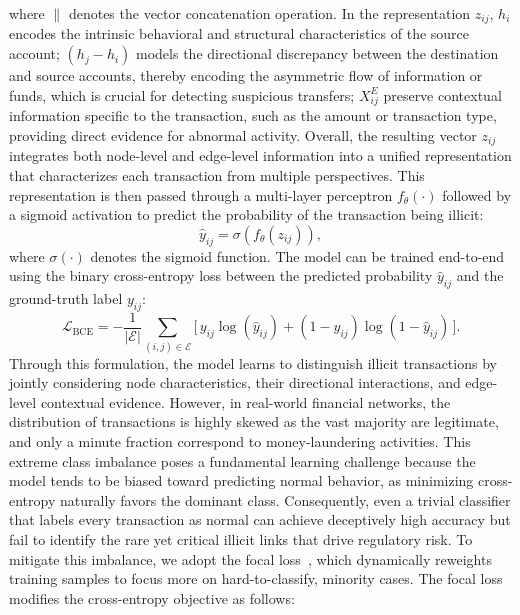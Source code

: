 \documentclass[11pt,english]{article}
\renewcommand{\hat}{\widehat}
\begin{document}
where $\|$ denotes the vector concatenation operation. In the representation $z_{ij}$, $h_i$ encodes the intrinsic behavioral and structural characteristics of the source account; $(h_j - h_i)$ models the directional discrepancy between the destination and source accounts, thereby encoding the asymmetric flow of information or funds, which is crucial for detecting suspicious transfers; $X^E_{ij}$ preserve contextual information specific to the transaction, such as the amount or transaction type, providing direct evidence for abnormal activity. Overall, the resulting vector $z_{ij}$ integrates both node-level and edge-level information into a unified representation that characterizes each transaction from multiple perspectives. This representation is then passed through a multi-layer perceptron $f_{\theta}(\cdot)$ followed by a sigmoid activation to predict the probability of the transaction being illicit:
\begin{equation}
    \hat{y}_{ij} = \sigma ( f_\theta(z_{ij})),
\end{equation}
where $\sigma(\cdot)$ denotes the sigmoid function. The model can be trained end-to-end using the binary cross-entropy loss between the predicted probability $\hat{y}_{ij}$ and the ground-truth label $y_{ij}$:
\begin{equation}
    \mathcal{L}_{\text{BCE}} = - \frac{1}{|\mathcal{E}|} \sum_{(i,j) \in \mathcal{E}} \Big[\, y_{ij} \log(\hat{y}_{ij}) + (1 - y_{ij}) \log(1 - \hat{y}_{ij}) \,\Big].
\end{equation}
Through this formulation, the model learns to distinguish illicit transactions by jointly considering node characteristics, their directional interactions, and edge-level contextual evidence. 
However, in real-world financial networks, the distribution of transactions is highly skewed as the vast majority are legitimate, and only a minute fraction correspond to money-laundering activities. This extreme class imbalance poses a fundamental learning challenge because the model tends to be biased toward predicting normal behavior, as minimizing cross-entropy naturally favors the dominant class. Consequently, even a trivial classifier that labels every transaction as normal can achieve deceptively high accuracy but fail to identify the rare yet critical illicit links that drive regulatory risk. To mitigate this imbalance, we adopt the focal loss~\parencite{lin2017focal}, which dynamically reweights training samples to focus more on hard-to-classify, minority cases. The focal loss modifies the cross-entropy objective as follows:
\end{document}
